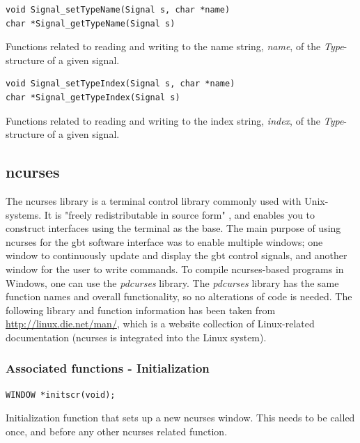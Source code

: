 \documentclass[main.tex]{subfiles}
\begin{document}
\begin{lstlisting}[frame=single] 
void Signal_setTypeName(Signal s, char *name)
char *Signal_getTypeName(Signal s)
\end{lstlisting}
Functions related to reading and writing to the name string, \textit{name}, of the \textit{Type}-structure of a given signal.\\

\begin{lstlisting}[frame=single] 
void Signal_setTypeIndex(Signal s, char *name)
char *Signal_getTypeIndex(Signal s)
\end{lstlisting}
Functions related to reading and writing to the index string, \textit{index}, of the \textit{Type}-structure of a given signal.

\subsection{ncurses} \label{sec:ncurses}

The ncurses library is a terminal control library commonly used with Unix-systems. It is "freely redistributable in source form" \cite{ncursesdoc}, and enables you to construct interfaces using the terminal as the base. The main purpose of using ncurses for the \gls{gbt} software interface was to enable multiple windows; one window to continuously update and display the \gls{gbt} control signals, and another window for the user to write commands. To compile ncurses-based programs in Windows, one can use the \textit{pdcurses} library. The \textit{pdcurses} library has the same function names and overall functionality, so no alterations of code is needed. The following library and function information has been taken from \url{http://linux.die.net/man/}, which is a website collection of Linux-related documentation (ncurses is integrated into the Linux system). 

\subsubsection{Associated functions - Initialization} \label{sub:ncinit}


\begin{lstlisting}[frame=single] 
WINDOW *initscr(void);
\end{lstlisting}
Initialization function that sets up a new ncurses window. This needs to be called once, and before any other ncurses related function.\\
\end{document}
